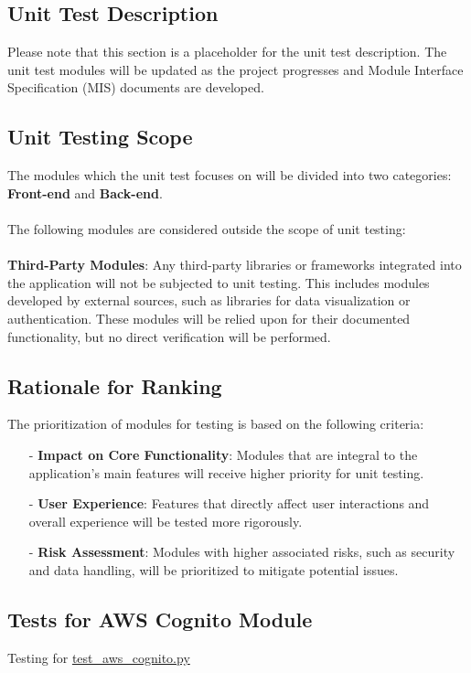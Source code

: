 \documentclass[12pt, titlepage]{article}
\begin{document}
\begin{enumerate}
\begin{enumerate}
\begin{enumerate}
\section{Unit Test Description}
Please note that this section is a placeholder for the unit test description. The unit test modules will be updated as the project progresses and Module Interface Specification (MIS) documents are developed.
\subsection{Unit Testing Scope}
The modules which the unit test focuses on will be divided into two categories: \textbf{Front-end} and \textbf{Back-end}.\\\\
The following modules are considered outside the scope of unit testing:\\\\
\textbf{Third-Party Modules}: 
Any third-party libraries or frameworks integrated into the application will not be subjected to unit testing. This includes modules developed by external sources, such as libraries for data visualization or authentication. These modules will be relied upon for their documented functionality, but no direct verification will be performed.


\subsection{Rationale for Ranking}
The prioritization of modules for testing is based on the following criteria:
\begin{itemize}
    \item[-] \textbf{Impact on Core Functionality}: Modules that are integral to the application’s main features will receive higher priority for unit testing.
    \item[-] \textbf{User Experience}: Features that directly affect user interactions and overall experience will be tested more rigorously.
    \item[-] \textbf{Risk Assessment}: Modules with higher associated risks, such as security and data handling, will be prioritized to mitigate potential issues.
\end{itemize}

\subsection{Tests for AWS Cognito Module}
Testing for \href{https://github.com/RezaJodeiri/CXR-Capstone/blob/main/src/backend/test/test_aws_conito.py}{test\_aws\_cognito.py} \\


\end{enumerate}
\end{enumerate}
\end{enumerate}
\end{document}
